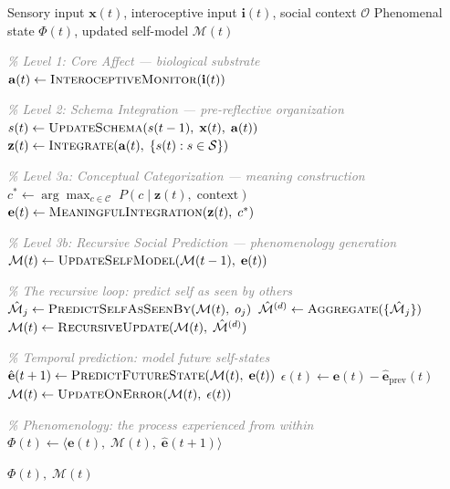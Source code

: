 \documentclass[11pt]{article}
\begin{document}
\begin{algorithm}[H]
\caption{Recursive Social Prediction (RSP) --- Consciousness Generation Loop}
\label{alg:rsp}
\begin{algorithmic}[1]
\Require Sensory input $\mathbf{x}(t)$, interoceptive input $\mathbf{i}(t)$, social context $\mathcal{O}$
\Ensure Phenomenal state $\Phi(t)$, updated self-model $\mathcal{M}(t)$

\Statex \textcolor{gray}{\textit{\% Level 1: Core Affect --- biological substrate}}
\State $\mathbf{a}(t) \gets \textsc{InteroceptiveMonitor}(\mathbf{i}(t))$ 

\Statex
\Statex \textcolor{gray}{\textit{\% Level 2: Schema Integration --- pre-reflective organization}}
    \State $s(t) \gets \textsc{UpdateSchema}(s(t-1),\; \mathbf{x}(t),\; \mathbf{a}(t))$
\EndFor
\State $\mathbf{z}(t) \gets \textsc{Integrate}(\mathbf{a}(t),\; \{s(t) : s \in \mathcal{S}\})$ 

\Statex
\Statex \textcolor{gray}{\textit{\% Level 3a: Conceptual Categorization --- meaning construction}}
\State $c^* \gets \arg\max_{c \in \mathcal{C}} \; P(c \mid \mathbf{z}(t),\; \text{context})$ 
\State $\mathbf{e}(t) \gets \textsc{MeaningfulIntegration}(\mathbf{z}(t),\; c^*)$ 

\Statex
\Statex \textcolor{gray}{\textit{\% Level 3b: Recursive Social Prediction --- phenomenology generation}}
\State $\mathcal{M}(t) \gets \textsc{UpdateSelfModel}(\mathcal{M}(t-1),\; \mathbf{e}(t))$

\Statex
\Statex \textcolor{gray}{\textit{\% The recursive loop: predict self as seen by others}}
 
        \State $\hat{\mathcal{M}}_j \gets \textsc{PredictSelfAsSeenBy}(\mathcal{M}(t),\; o_j)$
    \EndFor
    \State $\hat{\mathcal{M}}^{(d)} \gets \textsc{Aggregate}(\{\hat{\mathcal{M}}_j\})$
    \State $\mathcal{M}(t) \gets \textsc{RecursiveUpdate}(\mathcal{M}(t),\; \hat{\mathcal{M}}^{(d)})$
\EndFor

\Statex
\Statex \textcolor{gray}{\textit{\% Temporal prediction: model future self-states}}
\State $\hat{\mathbf{e}}(t+1) \gets \textsc{PredictFutureState}(\mathcal{M}(t),\; \mathbf{e}(t))$
\State $\epsilon(t) \gets \mathbf{e}(t) - \hat{\mathbf{e}}_{\text{prev}}(t)$ 
\State $\mathcal{M}(t) \gets \textsc{UpdateOnError}(\mathcal{M}(t),\; \epsilon(t))$

\Statex
\Statex \textcolor{gray}{\textit{\% Phenomenology: the process experienced from within}}
\State $\Phi(t) \gets \langle \mathbf{e}(t),\; \mathcal{M}(t),\; \hat{\mathbf{e}}(t+1) \rangle$

\State \Return $\Phi(t),\; \mathcal{M}(t)$
\end{algorithmic}
\end{algorithm}
\end{document}
